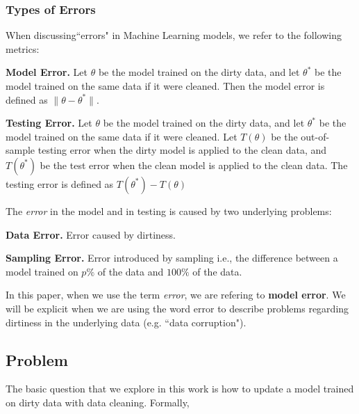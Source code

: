 \subsubsection{Types of Errors}
When discussing``errors" in Machine Learning models, we refer to the following metrics:

\vspace{0.5em}

\noindent\textbf{Model Error. } Let $\theta$ be the model trained on the dirty data, and let $\theta^*$ be the model trained on the same data if it were cleaned. Then the model error is defined as $\|\theta - \theta^*\|$.

\vspace{0.5em}

\noindent\textbf{Testing Error. } Let $\theta$ be the model trained on the dirty data, and let $\theta^*$ be the model trained on the same data if it were cleaned. Let $T(\theta)$ be the out-of-sample testing error when the dirty model is applied to the clean data, and $T(\theta^*)$ be the test error when the clean model is applied to the clean data. The testing error is defined as $T(\theta^*) - T(\theta)$

\vspace{0.5em}

\noindent The \emph{error} in the model and in testing is caused by two underlying problems:

\vspace{0.5em}

\noindent\textbf{Data Error. } Error caused by dirtiness.

\vspace{0.5em}

\noindent\textbf{Sampling Error. } Error introduced by sampling i.e., the difference between a model trained on $p\%$ of the data and $100\%$ of the data.

\vspace{0.5em}

In this paper, when we use the term \emph{error}, we are refering to \textbf{model error}.
We will be explicit when we are using the word error to describe problems regarding dirtiness in the underlying data (e.g. ``data corruption").

\subsection{\sys Problem}
The basic question that we explore in this work is how to update a model trained on dirty data with data cleaning. Formally,

